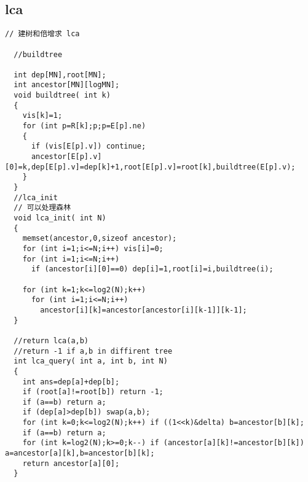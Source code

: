 \subsection{lca}
\begin{lstlisting}[language={}]
// 建树和倍增求 lca

  //buildtree

  int dep[MN],root[MN];
  int ancestor[MN][logMN];
  void buildtree( int k)
  {
    vis[k]=1;
    for (int p=R[k];p;p=E[p].ne)
    {
      if (vis[E[p].v]) continue;
      ancestor[E[p].v][0]=k,dep[E[p].v]=dep[k]+1,root[E[p].v]=root[k],buildtree(E[p].v);
    }
  }
  //lca_init
  // 可以处理森林
  void lca_init( int N)
  {
    memset(ancestor,0,sizeof ancestor);
    for (int i=1;i<=N;i++) vis[i]=0;
    for (int i=1;i<=N;i++)
      if (ancestor[i][0]==0) dep[i]=1,root[i]=i,buildtree(i);

    for (int k=1;k<=log2(N);k++)
      for (int i=1;i<=N;i++)
        ancestor[i][k]=ancestor[ancestor[i][k-1]][k-1];
  }

  //return lca(a,b)
  //return -1 if a,b in diffirent tree
  int lca_query( int a, int b, int N)
  {
    int ans=dep[a]+dep[b];
    if (root[a]!=root[b]) return -1;
    if (a==b) return a;
    if (dep[a]>dep[b]) swap(a,b);
    for (int k=0;k<=log2(N);k++) if ((1<<k)&delta) b=ancestor[b][k];
    if (a==b) return a;
    for (int k=log2(N);k>=0;k--) if (ancestor[a][k]!=ancestor[b][k]) a=ancestor[a][k],b=ancestor[b][k];
    return ancestor[a][0];
  }
\end{lstlisting}
